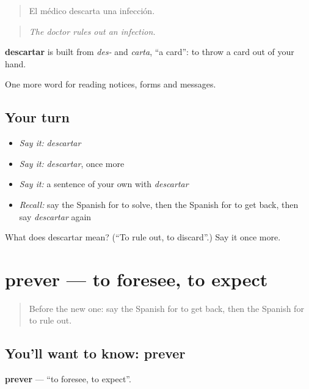 \begin{quote}
El médico descarta una infección.
\end{quote}

\begin{quote}
\emph{The doctor rules out an infection.}
\end{quote}

\begin{cousinweb}
\textbf{descartar} is built from \emph{des-} and \emph{carta}, \textquotedblleft{}a card\textquotedblright{}: to throw a card out of your hand.
\end{cousinweb}

\begin{grammarlens}[title={What you've built}]
One more word for reading notices, forms and messages.
\end{grammarlens}

\subsection*{Your turn}
\begin{itemize}
\raggedright
  \item \emph{Say it:} \emph{descartar}
  \item \emph{Say it:} \emph{descartar}, once more
  \item \emph{Say it:} a sentence of your own with \emph{descartar}
  \item \emph{Recall:} say the Spanish for to solve, then the Spanish for to get back, then say \emph{descartar} again
\end{itemize}

\begin{tcolorbox}[breakable,colback=teal!4,colframe=teal!35!black,title={Before you move on}]
What does descartar mean? (\textquotedblleft{}To rule out, to discard\textquotedblright{}.) Say it once more.
\end{tcolorbox}
\section[prever]{prever — to foresee, to expect}

\label{lesson:ES-C481-prever}



\begin{quote}
Before the new one: say the Spanish for to get back, then the Spanish for to rule out.
\end{quote}

\subsection*{You'll want to know: prever}
\textbf{prever} — \textquotedblleft{}to foresee, to expect\textquotedblright{}.

